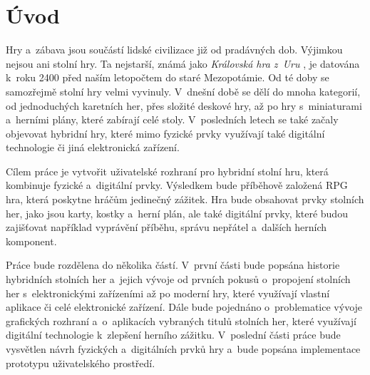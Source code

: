 \chapter{Úvod}
Hry a~zábava jsou součástí lidské civilizace již od pradávných dob. Výjimkou nejsou ani stolní hry. Ta nejstarší, známá jako \textit{Královská hra z~Uru} \cite{royal_game_of_ur}, je datována k~roku 2400 před naším letopočtem do staré Mezopotámie. Od té doby se samozřejmě stolní hry velmi vyvinuly. V~dnešní době se dělí do mnoha kategorií, od jednoduchých karetních her, přes složité deskové hry, až po hry s~miniaturami a~herními plány, které zabírají celé stoly. V~posledních letech se také začaly objevovat hybridní hry, které mimo fyzické prvky využívají také digitální technologie či jiná elektronická zařízení.

Cílem práce je vytvořit uživatelské rozhraní pro hybridní stolní hru, která kombinuje fyzické a~digitální prvky. Výsledkem bude příběhově založená RPG hra, která poskytne hráčům jedinečný zážitek. Hra bude obsahovat prvky stolních her, jako jsou karty, kostky a~herní plán, ale také digitální prvky, které budou zajišťovat například vyprávění příběhu, správu nepřátel a~dalších herních komponent.

Práce bude rozdělena do několika částí. V~první části bude popsána historie hybridních stolních her a~jejich vývoje od prvních pokusů o~propojení stolních her s~elektronickými zařízeními až po moderní hry, které využívají vlastní aplikace či celé elektronické zařízení. Dále bude pojednáno o~problematice vývoje grafických rozhraní a~o~aplikacích vybraných titulů stolních her, které využívají digitální technologie k~zlepšení herního zážitku. V~poslední části práce bude vysvětlen návrh fyzických a~digitálních prvků hry a~bude popsána implementace prototypu uživatelského prostředí.